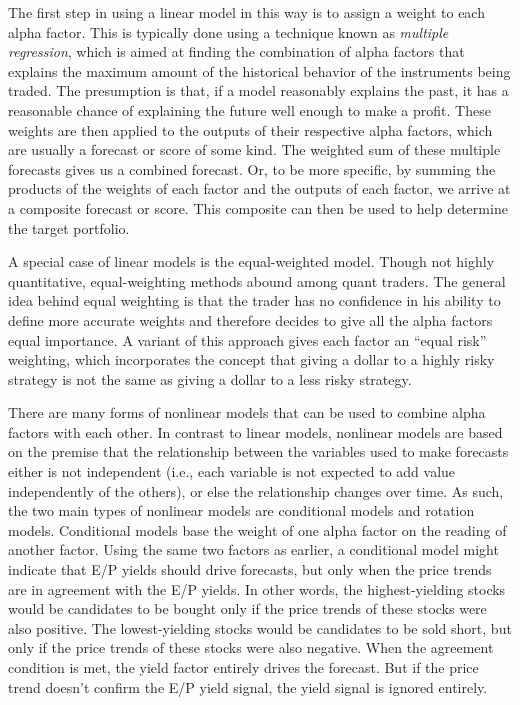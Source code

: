 \documentclass[11pt]{report}
\begin{document}
			The first step in using a linear model in this way is to assign a weight to each alpha factor. This is typically done using a technique known as \textit{multiple regression}, which is aimed at finding the combination of alpha factors that explains the maximum amount of the historical behavior of the instruments being traded. The presumption is that, if a model reasonably explains the past, it has a reasonable chance of explaining the future well enough to make a profit. These weights are then applied to the outputs of their respective alpha factors, which are usually a forecast or score of some kind. The weighted sum of these multiple forecasts gives us a combined forecast. Or, to be more specific, by summing the products of the weights of each factor and the outputs of each factor, we arrive at a composite forecast or score. This composite can then be used to help determine the target portfolio.

			A special case of linear models is the equal-weighted model. Though not highly quantitative, equal-weighting methods abound among quant traders. The general idea behind equal weighting is that the trader has no confidence in his ability to define more accurate weights and therefore decides to give all the alpha factors equal importance. A variant of this approach gives each factor an ``equal risk'' weighting, which incorporates the concept that giving a dollar to a highly risky strategy is not the same as giving a dollar to a less risky strategy.

			There are many forms of nonlinear models that can be used to combine alpha factors with each other. In contrast to linear models, nonlinear models are based on the premise that the relationship between the variables used to make forecasts either is not independent (i.e., each variable is not expected to add value independently of the others), or else the relationship changes over time. As such, the two main types of nonlinear models are conditional models and rotation models. Conditional models base the weight of one alpha factor on the reading of another factor. Using the same two factors as earlier, a conditional model might indicate that E/P yields should drive forecasts, but only when the price trends are in agreement with the E/P yields. In other words, the highest-yielding stocks would be candidates to be bought only if the price trends of these stocks were also positive. The lowest-yielding stocks would be candidates to be sold short, but only if the price trends of these stocks were also negative. When the agreement condition is met, the yield factor entirely drives the forecast. But if the price trend doesn't confirm the E/P yield signal, the yield signal is ignored entirely.
\end{document}
